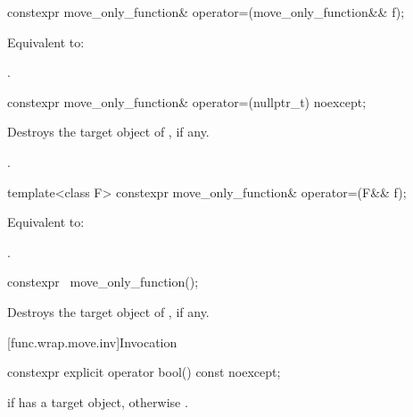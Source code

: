 %
\begin{itemdecl}
constexpr move_only_function& operator=(move_only_function&& f);
\end{itemdecl}

\begin{itemdescr}
\pnum
\effects
Equivalent to: 

\pnum
\returns
{}.
\end{itemdescr}

%
\begin{itemdecl}
constexpr move_only_function& operator=(nullptr_t) noexcept;
\end{itemdecl}

\begin{itemdescr}
\pnum
\effects
Destroys the target object of , if any.

\pnum
\returns
{}.
\end{itemdescr}

%
\begin{itemdecl}
template<class F> constexpr move_only_function& operator=(F&& f);
\end{itemdecl}

\begin{itemdescr}
\pnum
\effects
Equivalent to: 

\pnum
\returns
{}.
\end{itemdescr}

%
\begin{itemdecl}
constexpr ~move_only_function();
\end{itemdecl}

\begin{itemdescr}
\pnum
\effects
Destroys the target object of , if any.
\end{itemdescr}

[func.wrap.move.inv]{Invocation}

%
\begin{itemdecl}
constexpr explicit operator bool() const noexcept;
\end{itemdecl}

\begin{itemdescr}
\pnum
\returns
{} if  has a target object, otherwise .
\end{itemdescr}

